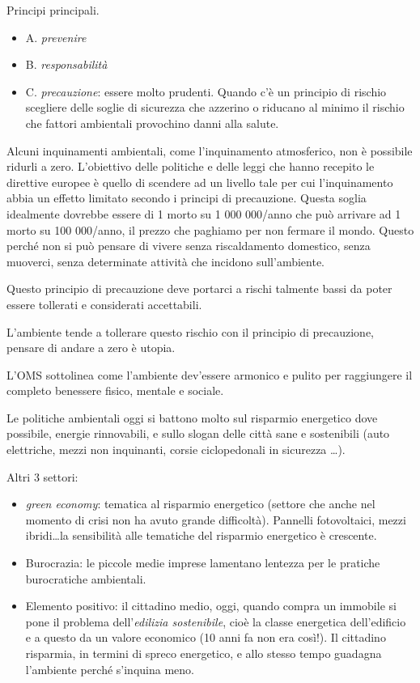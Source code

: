 Principi principali.

\begin{itemize}
\item
  A. \emph{prevenire}
\item
  B. \emph{responsabilità}
\item
  C. \emph{precauzione}: essere molto prudenti. Quando c'è un principio
  di rischio scegliere delle soglie di sicurezza che azzerino o riducano
  al minimo il rischio che fattori ambientali provochino danni alla
  salute.
\end{itemize}

Alcuni inquinamenti ambientali, come l'inquinamento atmosferico, non è
possibile ridurli a zero. L'obiettivo delle politiche e delle leggi che
hanno recepito le direttive europee è quello di scendere ad un livello
tale per cui l'inquinamento abbia un effetto limitato secondo i principi
di precauzione. Questa soglia idealmente dovrebbe essere di 1 morto su 1
000 000/anno che può arrivare ad 1 morto su 100 000/anno, il prezzo che
paghiamo per non fermare il mondo. Questo perché non si può pensare di
vivere senza riscaldamento domestico, senza muoverci, senza determinate
attività che incidono sull'ambiente.

Questo principio di precauzione deve portarci a rischi talmente bassi da
poter essere tollerati e considerati accettabili.

L'ambiente tende a tollerare questo rischio con il principio di
precauzione, pensare di andare a zero è utopia.

L'OMS sottolinea come l'ambiente dev'essere armonico e pulito per
raggiungere il completo benessere fisico, mentale e sociale.

Le politiche ambientali oggi si battono molto sul risparmio energetico
dove possibile, energie rinnovabili, e sullo slogan delle città sane e
sostenibili (auto elettriche, mezzi non inquinanti, corsie ciclopedonali
in sicurezza \ldots{}).

Altri 3 settori:

\begin{itemize}
\item
  \emph{green economy}: tematica al risparmio energetico (settore che
  anche nel momento di crisi non ha avuto grande difficoltà). Pannelli
  fotovoltaici, mezzi ibridi\ldots{}la sensibilità alle tematiche del
  risparmio energetico è crescente.
\item
  Burocrazia: le piccole medie imprese lamentano lentezza per le
  pratiche burocratiche ambientali.
\item
  Elemento positivo: il cittadino medio, oggi, quando compra un immobile
  si pone il problema dell'\emph{edilizia sostenibile}, cioè la classe
  energetica dell'edificio e a questo da un valore economico (10 anni fa
  non era così!). Il cittadino risparmia, in termini di spreco
  energetico, e allo stesso tempo guadagna l'ambiente perché s'inquina
  meno.
\end{itemize}

